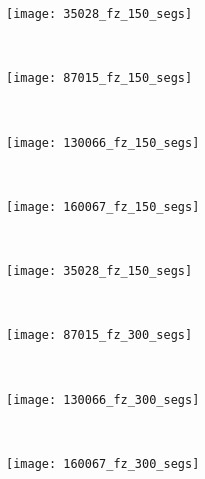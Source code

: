\begin{figure}[!ht]
    \begin{subfigure}[t]{\textwidth+20pt\relax}
    	\texttt{[image: 35028\_fz\_150\_segs]} 
    \end{subfigure}      
    ~ %
    \begin{subfigure}[b]{0.2\textwidth}
        \texttt{[image: 87015\_fz\_150\_segs]}
    \end{subfigure}
    ~ %
    \begin{subfigure}[b]{0.2\textwidth}
        \texttt{[image: 130066\_fz\_150\_segs]}
    \end{subfigure}
    ~ %
    \begin{subfigure}[b]{0.2\textwidth}
        \texttt{[image: 160067\_fz\_150\_segs]}
    \end{subfigure} \\ [2ex]
    
    \begin{subfigure}[t]{\textwidth+20pt\relax}
    	\texttt{[image: 35028\_fz\_150\_segs]} 
    \end{subfigure}      
    ~ %
    \begin{subfigure}[b]{0.2\textwidth}
        \texttt{[image: 87015\_fz\_300\_segs]}
    \end{subfigure}
    ~ %
    \begin{subfigure}[b]{0.2\textwidth}
        \texttt{[image: 130066\_fz\_300\_segs]}
    \end{subfigure}
    ~ %
    \begin{subfigure}[b]{0.2\textwidth}
        \texttt{[image: 160067\_fz\_300\_segs]}
    \end{subfigure} \\ [2ex]
    

\end{figure}
